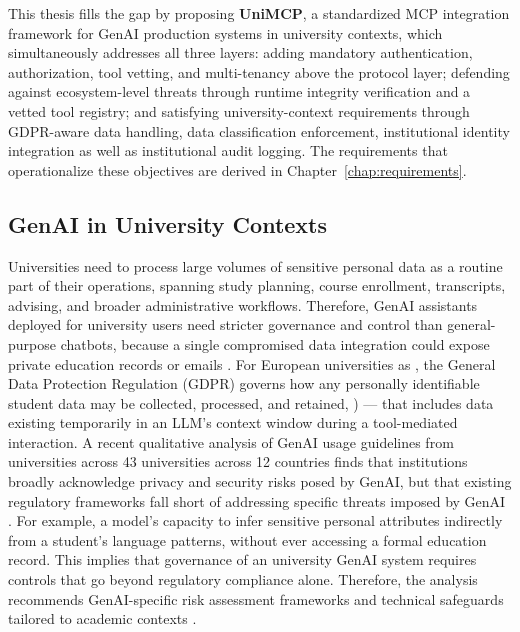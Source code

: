 \documentclass[english, 12pt, a4paper, elec, utf8, a-2b, online]{aaltothesis}
\newcommand{\UniMCP}{\textbf{UniMCP}\xspace}
\newcommand{\aalto}{\text{Aalto University}\xspace}
\begin{document}
This thesis fills the gap by proposing \textbf{\UniMCP}, a standardized MCP integration framework for GenAI production systems in university contexts, which simultaneously addresses all three layers:
adding mandatory authentication, authorization, tool vetting, and multi-tenancy above the protocol layer;
defending against ecosystem-level threats through runtime integrity verification and a vetted tool registry; and satisfying university-context requirements through GDPR-aware data handling, data classification enforcement, institutional identity integration as well as institutional audit logging.
The requirements that operationalize these objectives are derived in Chapter~\ref{chap:requirements}.

\subsection{GenAI in University Contexts}
Universities need to process large volumes of sensitive personal data as a routine part of their operations, spanning study planning, course enrollment, transcripts, advising, and broader administrative workflows. 
Therefore, GenAI assistants deployed for university users need stricter governance and control than general-purpose chatbots, because a single compromised data integration could expose private education records or emails \cite{ng2025security}.
For European universities as \aalto, the General Data Protection Regulation (GDPR) governs how any personally identifiable student data may be collected, processed, and retained, \cite{gdpr2016}) --- that includes data existing temporarily in an LLM's context window during a tool-mediated interaction.
A recent qualitative analysis of GenAI usage guidelines from universities across 43 universities across 12 countries finds that institutions broadly acknowledge privacy and security risks posed by GenAI, but that existing regulatory frameworks fall short of addressing specific threats imposed by GenAI \cite{ng2025security}.
For example, a model's capacity to infer sensitive personal attributes indirectly from a student's language patterns, without
ever accessing a formal education record.
This implies that governance of an university GenAI system requires controls that go beyond regulatory compliance alone.
Therefore, the analysis recommends GenAI-specific risk assessment frameworks and technical safeguards tailored to academic contexts \cite{ng2025security}.
\end{document}
